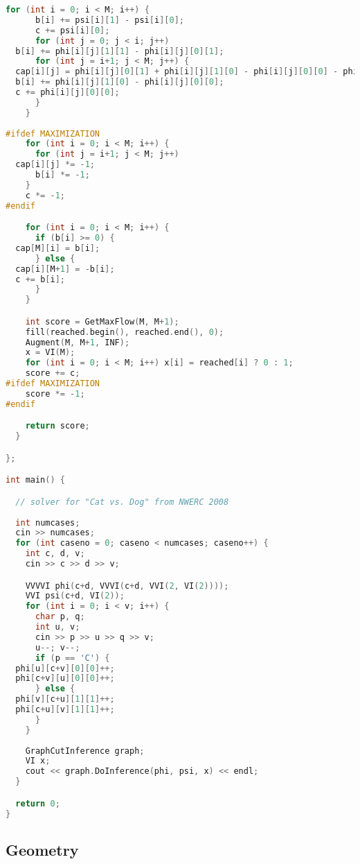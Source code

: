 \begin{lstlisting}[language=C++]
    for (int i = 0; i < M; i++) {
      b[i] += psi[i][1] - psi[i][0];
      c += psi[i][0];
      for (int j = 0; j < i; j++)
  b[i] += phi[i][j][1][1] - phi[i][j][0][1];
      for (int j = i+1; j < M; j++) {
  cap[i][j] = phi[i][j][0][1] + phi[i][j][1][0] - phi[i][j][0][0] - phi[i][j][1][1];
  b[i] += phi[i][j][1][0] - phi[i][j][0][0];
  c += phi[i][j][0][0];
      }
    }
    
#ifdef MAXIMIZATION
    for (int i = 0; i < M; i++) {
      for (int j = i+1; j < M; j++) 
  cap[i][j] *= -1;
      b[i] *= -1;
    }
    c *= -1;
#endif

    for (int i = 0; i < M; i++) {
      if (b[i] >= 0) {
  cap[M][i] = b[i];
      } else {
  cap[i][M+1] = -b[i];
  c += b[i];
      }
    }

    int score = GetMaxFlow(M, M+1);
    fill(reached.begin(), reached.end(), 0);
    Augment(M, M+1, INF);
    x = VI(M);
    for (int i = 0; i < M; i++) x[i] = reached[i] ? 0 : 1;
    score += c;
#ifdef MAXIMIZATION
    score *= -1;
#endif

    return score;
  }

};

int main() {

  // solver for "Cat vs. Dog" from NWERC 2008
  
  int numcases;
  cin >> numcases;
  for (int caseno = 0; caseno < numcases; caseno++) {
    int c, d, v;
    cin >> c >> d >> v;

    VVVVI phi(c+d, VVVI(c+d, VVI(2, VI(2))));
    VVI psi(c+d, VI(2));
    for (int i = 0; i < v; i++) {
      char p, q;
      int u, v;
      cin >> p >> u >> q >> v;
      u--; v--;
      if (p == 'C') {
  phi[u][c+v][0][0]++;
  phi[c+v][u][0][0]++;
      } else {
  phi[v][c+u][1][1]++;
  phi[c+u][v][1][1]++;
      }
    }
    
    GraphCutInference graph;
    VI x;
    cout << graph.DoInference(phi, psi, x) << endl;
  }

  return 0;
}

\end{lstlisting}
\subsection{Geometry}
